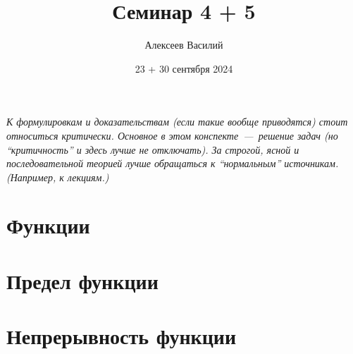 \documentclass[a4paper,12pt]{article}
\author{Алексеев Василий}
\title{Семинар 4 + 5}
\date{23 + 30 сентября 2024}
\begin{document}
  \maketitle
  
  \tableofcontents

  \thispagestyle{empty}
  
  \newpage
  
  
  
  \vspace*{\fill}
  
  \noindent
  \emph{
    К формулировкам и доказательствам (если такие вообще приводятся) стоит относиться критически.
    Основное в этом конспекте~---~решение задач (но ``критичность'' и здесь лучше не отключать).
    За строгой, ясной и последовательной теорией лучше обращаться к ``нормальным'' источникам.
    (Например, к лекциям.)
  }
  
  \vspace*{\fill}
  
  \thispagestyle{empty}
  
  \newpage
  
  


  \section{Функции}
  


  
  

  \section{Предел функции}



  \section{Непрерывность функции}
\end{document}
